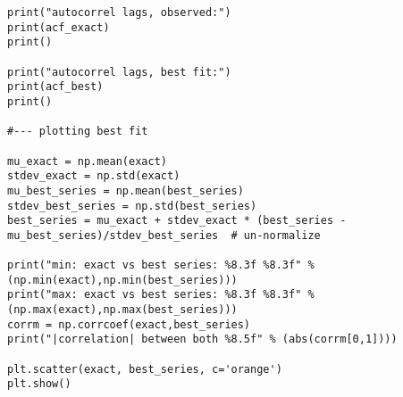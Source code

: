 \documentclass[oneside,10pt]{book}
\begin{document}
\begin{lstlisting}
print("autocorrel lags, observed:")
print(acf_exact)
print()

print("autocorrel lags, best fit:")
print(acf_best)
print()

#--- plotting best fit

mu_exact = np.mean(exact)
stdev_exact = np.std(exact)
mu_best_series = np.mean(best_series)
stdev_best_series = np.std(best_series)
best_series = mu_exact + stdev_exact * (best_series - mu_best_series)/stdev_best_series  # un-normalize

print("min: exact vs best series: %8.3f %8.3f" % (np.min(exact),np.min(best_series)))
print("max: exact vs best series: %8.3f %8.3f" % (np.max(exact),np.max(best_series)))
corrm = np.corrcoef(exact,best_series)
print("|correlation| between both %8.5f" % (abs(corrm[0,1]))) 

plt.scatter(exact, best_series, c='orange') 
plt.show()
\end{lstlisting}\vspace{1ex}

\end{document}

